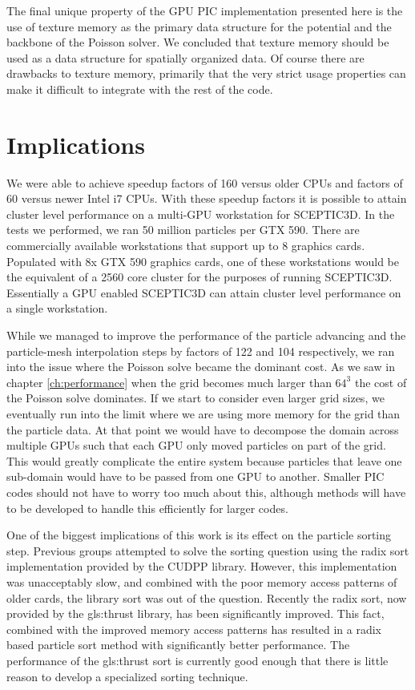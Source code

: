 The final unique property of the GPU PIC implementation presented here is the use of texture memory as the primary data structure for the potential and the backbone of the Poisson solver. We concluded that texture memory should be used as a data structure for spatially organized data. Of course there are drawbacks to texture memory, primarily that the very strict usage properties can make it difficult to integrate with the rest of the code. 



\section{Implications}
We were able to achieve speedup factors of 160 versus older CPUs and factors of 60 versus newer Intel i7 CPUs. With these speedup factors it is possible to attain cluster level performance on a multi-GPU workstation for SCEPTIC3D. In the tests we performed, we ran 50 million particles per GTX 590. There are commercially available workstations that support up to 8 graphics cards. Populated with 8x GTX 590 graphics cards, one of these workstations would be the equivalent of a 2560 core cluster for the purposes of running SCEPTIC3D. Essentially a GPU enabled SCEPTIC3D can attain cluster level performance on a single workstation. 

While we managed to improve the performance of the particle advancing and the particle-mesh interpolation steps by factors of 122 and 104 respectively, we ran into the issue where the Poisson solve became the dominant cost. As we saw in chapter \ref{ch:performance} when the grid becomes much larger than $64^3$ the cost of the Poisson solve dominates. If we start to consider even larger grid sizes, we eventually run into the limit where we are using more memory for the grid than the particle data. At that point we would have to decompose the domain across multiple GPUs such that each GPU only moved particles on part of the grid. This would greatly complicate the entire system because particles that leave one sub-domain would have to be passed from one GPU to another. Smaller PIC codes should not have to worry too much about this, although methods will have to be developed to handle this efficiently for larger codes.

One of the biggest implications of this work is its effect on the particle sorting step. Previous groups attempted to solve the sorting question using the radix sort implementation provided by the CUDPP library. However, this implementation was unacceptably slow, and combined with the poor memory access patterns of older cards, the library sort was out of the question. Recently the radix sort, now provided by the \gls{gls:thrust} library, has been significantly improved. This fact, combined with the improved memory access patterns has resulted in a radix based particle sort method with significantly better performance. The performance of the \gls{gls:thrust} sort is currently good enough that there is little reason to develop a specialized sorting technique. 

